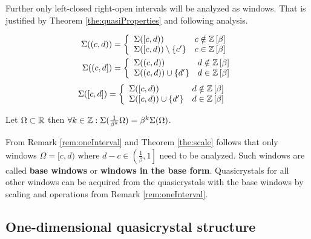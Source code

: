 \documentclass[text.tex]{subfiles}
\begin{document}
\begin{remark}
\label{rem:oneInterval}
Further only left-closed right-open intervals will be analyzed as windows. That is justified by Theorem \ref{the:quasiProperties} and following analysis.
%
\begin{multicols}{2}
\noindent\begin{align*}
\Sigma((c,d)) &= \left\{ 
	\begin{array}{l l}
	\Sigma([c,d)) & c \notin \mathbb{Z}\left[\beta\right]\\
	\Sigma([c,d))\setminus\{c'\} & c \in \mathbb{Z}\left[\beta\right]
	\end{array} \right.\\
\Sigma((c,d]) &= \left\{ 
	\begin{array}{l l}
	\Sigma((c,d)) & d \notin \mathbb{Z}\left[\beta\right]\\
	\Sigma((c,d))\cup\{d'\} & d \in \mathbb{Z}\left[\beta\right]
	\end{array} \right.\\
\end{align*}
\begin{align*}
\Sigma([c,d]) &= \left\{ 
	\begin{array}{l l}
	\Sigma([c,d)) & d \notin \mathbb{Z}\left[\beta\right]\\
	\Sigma([c,d))\cup\{d'\} & d \in \mathbb{Z}\left[\beta\right]
	\end{array} \right.
\end{align*}
\end{multicols}
%
\end{remark}

\begin{theorem}
\label{the:scale}
Let $\Omega \subset \mathbb{R}$ then $\forall k\in \mathbb{Z}: \Sigma(\frac{1}{\beta^k}\Omega) = \beta^k\Sigma(\Omega)$.
\end{theorem}

\begin{corollary}
\label{cor:baseInterval}
From Remark \ref{rem:oneInterval} and Theorem \ref{the:scale} follows that only windows $\Omega = [c,d)$ where $d-c\in\left( \frac{1}{\beta}, 1 \right]$ need to be analyzed. Such windows are called \textbf{base windows} or \textbf{windows in the base form}. Quasicrystals for all other windows can be acquired from the quasicrystals with the base windows by scaling and operations from Remark \ref{rem:oneInterval}.
\end{corollary}

\subsection{One-dimensional quasicrystal structure}%
\end{document}
